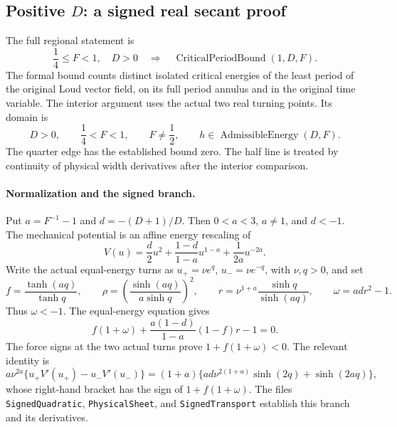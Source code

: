 
\subsection{Positive $D$: a signed real secant proof}
\label{lean17:positive-d-proof}

The full regional statement is
\[
 \frac14\le F<1,\quad D>0
 \quad\Longrightarrow\quad
 \operatorname{CriticalPeriodBound}(1,D,F).
\]
The formal bound counts distinct isolated critical energies of the least
period of the original Loud vector field, on its full period annulus and
in the original time variable. The interior argument uses the actual two
real turning points. Its domain is
\[
 D>0,\qquad \frac14<F<1,\qquad F\ne\frac12,\qquad
 h\in\operatorname{AdmissibleEnergy}(D,F).
\]
The quarter edge has the established bound zero. The half line is treated
by continuity of physical width derivatives after the interior comparison.

\paragraph{Normalization and the signed branch.}
Put $a=F^{-1}-1$ and $d=-(D+1)/D$. Then $0<a<3$, $a\ne1$, and
$d<-1$. The mechanical potential is an affine energy rescaling of
\[
 V(u)=\frac d2u^2+\frac{1-d}{1-a}u^{1-a}
       +\frac1{2a}u^{-2a}.
\]
Write the actual equal-energy turns as
$u_+=\nu e^q$, $u_-=\nu e^{-q}$, with $\nu,q>0$, and set
\[
 f=\frac{\tanh(aq)}{\tanh q},\qquad
 \rho=\left(\frac{\sinh(aq)}{a\sinh q}\right)^2,\qquad
 r=\nu^{1+a}\frac{\sinh q}{\sinh(aq)},\qquad
 \omega=ad r^2-1.
\]
Thus $\omega<-1$. The equal-energy equation gives
\[
 f(1+\omega)+\frac{a(1-d)}{1-a}(1-f)r-1=0.
\]
The force signs at the two actual turns prove
$1+f(1+\omega)<0$. The relevant identity is
\[
 a\nu^{2a}\{u_+V'(u_+)-u_-V'(u_-)\}
 =(1+a)\{ad\nu^{2(1+a)}\sinh(2q)+\sinh(2aq)\},
\]
whose right-hand bracket has the sign of $1+f(1+\omega)$.
The files \texttt{SignedQuadratic}, \texttt{PhysicalSheet}, and
\texttt{SignedTransport} establish this branch and its derivatives.


